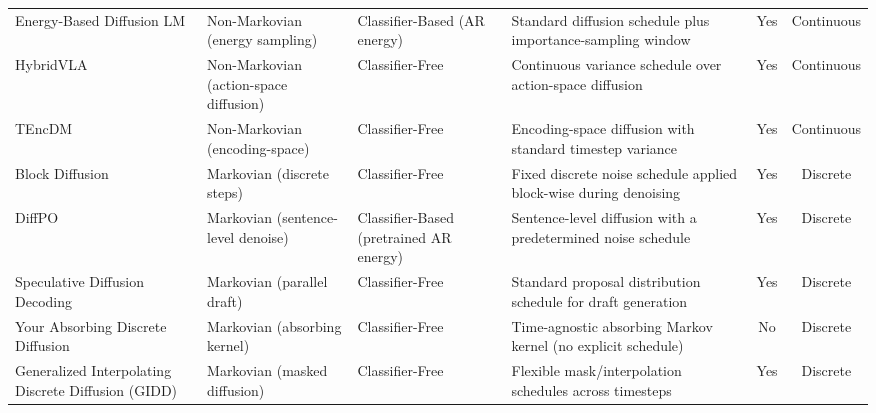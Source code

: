 \begin{table*}[ht!]
\begin{tabularx}{\textwidth}{X  X  X  >{\RaggedRight\hyphenpenalty=50\tolerance=1000}X  c  c}
    Energy-Based Diffusion LM \cite{xu_energy-based_2025}
      & Non-Markovian (energy sampling)
      & Classifier-Based (AR energy)
      & Standard diffusion schedule plus importance-sampling window
      & Yes
      & Continuous \\

    HybridVLA \cite{liu_hybridvla_2025}
      & Non-Markovian (action-space diffusion)
      & Classifier-Free
      & Continuous variance schedule over action-space diffusion
      & Yes
      & Continuous \\

    TEncDM \cite{shabalin_tencdm_2025}
      & Non-Markovian (encoding-space)
      & Classifier-Free
      & Encoding-space diffusion with standard timestep variance
      & Yes
      & Continuous \\

    Block Diffusion \cite{arriola_block_2025}
      & Markovian (discrete steps)
      & Classifier-Free
      & Fixed discrete noise schedule applied block-wise during denoising
      & Yes
      & Discrete \\

    DiffPO \cite{chen_diffpo_2025}
      & Markovian (sentence-level denoise)
      & Classifier-Based (pretrained AR energy)
      & Sentence-level diffusion with a predetermined noise schedule
      & Yes
      & Discrete \\

    Speculative Diffusion Decoding \cite{christopher_speculative_2025}
      & Markovian (parallel draft)
      & Classifier-Free
      & Standard proposal distribution schedule for draft generation
      & Yes
      & Discrete \\

    Your Absorbing Discrete Diffusion \cite{ou_your_2025}
      & Markovian (absorbing kernel)
      & Classifier-Free
      & Time-agnostic absorbing Markov kernel (no explicit schedule)
      & No
      & Discrete \\

    Generalized Interpolating Discrete Diffusion (GIDD) \cite{rutte_generalized_2025}
      & Markovian (masked diffusion)
      & Classifier-Free
      & Flexible mask/interpolation schedules across timesteps
      & Yes
      & Discrete \\

    \bottomrule
  \end{tabularx}
\end{table*}
